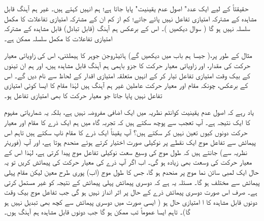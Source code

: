 حقیقتاً      کے لیے ایک عدد"  اصول عدم یقینیت"  پایا جاتا ہے؛ ہم انہیں  کہتے ہیں۔ غیر ہم آہنگ قابل مشاہدہ کے مشترکہ امتیازی تفاعل نہیں پائے جاتے؛  کم از کم ان کے مشترکہ امتیازی تفاعلات  کا مکمل  سلسلہ نہیں ہو گا ( سوال   دیکھیں )۔ اس کے برعکس ہم آہنگ (قابل تبادل)  قابل مشاہدہ  کے  مشترکہ امتیازی تفاعلات کا مکمل سلسلہ ممکن ہے۔


مثال کے طور پر،(  جیسا ہم باب   میں دیکھیں گے)   ہائیڈروجن جوہر کا ہیملٹنی،  اس کی زاویائی معیار حرکت کی مقدار،  اور زاویائی معیار حرکت کا  جزو  باہمی ہم آہنگ قابل مشاہدہ ہیں،  اور ہم ان تینوں کے بیک وقت امتیازی تفاعل تیار کر  کے  انہیں متعلقہ امتیازی اقدار کے لحاظ سے نام دیں گے۔ اس کے برعکس، چونکہ مقام اور معیار حرکت   عاملین غیر ہم آہنگ ہیں لہٰذا  مقام کا ایسا کوئی امتیازی تفاعل نہیں پایا جاتا جو معیار حرکت کا بھی امتیازی تفاعل ہو۔

 یاد رہے کہ اصول  عدم یقینیت   کوانٹم نظریہ میں ایک اضافی مفروضہ نہیں ہے،  بلکہ یہ شماریاتی مفہوم کا ایک نتیجہ ہے۔ آپ تعجب  سے پوچھ سکتے ہیں کہ تجربہ گاہ میں ہم ایک ذرے کا مقام اور معیار حرکت دونوں  کیوں تعین نہیں کر سکتے ہیں؟  آپ یقیناً ایک ذرے کا مقام  ناپ سکتے ہیں تاہم اس   پیمائش سے تفاعل موج ایک نقطے پر نوکیلی صورت اختیار کرتے ہوئے  منحدم  ہوتا  ہے،  اور آپ (فوریئر نظریہ سے)  جانتے ہیں کہ طول موج کی وسیع سعت نوکیلی تفاعل موج پیدا کرتی ہے،  لہٰذا اس کے  معیار حرکت کی وسعت بھی زیادہ ہو گی۔ اب اگر آپ ذرے کی  معیار حرکت کی پیمائش کریں تو  یہ حال  ایک لمبی سائن  نما موج پر منحدم ہو گا،  جس کا  طول موج (اب)   پوری طرح معین  لیکن    مقام پہلی پیمائش سے مختلف ہو گا۔  مسئلہ یہ ہے کہ دوسری پیمائش پہلی پیمائش کے نتیجہ کو  غیر مستمل کرتی ہے۔ صرف اس صورت  دوسری پیمائش ذرے  کے حال پر اثر انداز نہیں ہو گی  جب تفاعل موج بیک وقت دونوں قابل مشاہدہ  کا ا امتیازی حال ہو ( ایسی صورت میں دوسری پیمائش سے کچھ بھی تبدیل نہیں ہو گا)۔ تاہم  ایسا عموماً تب ممکن ہو گا جب  دونوں قابل مشاہدہ ہم آہنگ ہوں۔
 
